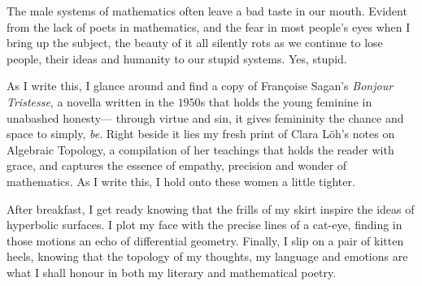\documentclass[11pt, letterpaper]{article}
\begin{document}
The male systems of mathematics often leave a bad taste in our mouth. Evident from the lack of poets in mathematics, and the fear in most people's eyes when I bring up the subject, the beauty of it all silently rots as we continue to lose people, their ideas and humanity to our stupid systems. Yes, stupid. 

As I write this, I glance around and find a copy of Fran\c{c}oise Sagan's \textit{Bonjour Tristesse}, a novella written in the $1950$s that holds the young feminine in unabashed honesty--- through virtue and sin, it gives femininity the chance and space to simply, \textit{be}. Right beside it lies my fresh print of Clara L{\"o}h's notes on Algebraic Topology, a  compilation of her teachings that holds the reader with grace, and captures the essence of empathy, precision and wonder of mathematics. As I write this, I hold onto these women a little tighter. 

After breakfast, I get ready knowing that the frills of my skirt inspire the ideas of hyperbolic surfaces. I plot my face with the precise lines of a cat-eye, finding in those motions an echo of differential geometry. Finally, I slip on a pair of kitten heels, knowing that the topology of my thoughts, my language and emotions are what I shall honour in both my literary and mathematical poetry.
\end{document}
